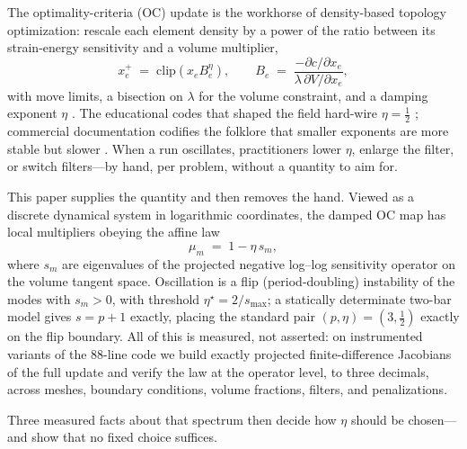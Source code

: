 \documentclass[11pt,a4paper]{article}
\newcommand{\smax}{s_{\max}}
\newcommand{\etastar}{\eta^{\star}}
\begin{document}
The optimality-criteria (OC) update is the workhorse of density-based
topology optimization: rescale each element density by a power of the
ratio between its strain-energy sensitivity and a volume multiplier,
\begin{equation}
  x_e^{+} \;=\; \mathrm{clip}\!\left( x_e B_e^{\eta} \right),
  \qquad
  B_e \;=\; \frac{-\partial c/\partial x_e}{\lambda\,\partial V/\partial x_e},
  \label{eq:oc}
\end{equation}
with move limits, a bisection on $\lambda$ for the volume constraint,
and a damping exponent $\eta$ \citep{bendsoe1989}. The educational codes
that shaped the field hard-wire $\eta=\tfrac12$
\citep{sigmund2001top99,andreassen2011top88}; commercial documentation
codifies the folklore that smaller exponents are more stable but slower
\citep{abaqus_stressratio}. When a run oscillates, practitioners lower
$\eta$, enlarge the filter, or switch filters---by hand, per problem,
without a quantity to aim for.

This paper supplies the quantity and then removes the hand. Viewed as a
discrete dynamical system in logarithmic coordinates, the damped OC map
has local multipliers obeying the affine law
\begin{equation}
  \mu_m \;=\; 1-\eta\, s_m ,
  \label{eq:law}
\end{equation}
where $s_m$ are eigenvalues of the projected negative log--log
sensitivity operator on the volume tangent space. Oscillation is a flip
(period-doubling) instability of the modes with $s_m>0$, with threshold
$\etastar = 2/\smax$; a statically determinate two-bar model gives
$s=p{+}1$ exactly, placing the standard pair $(p,\eta)=(3,\tfrac12)$
exactly on the flip boundary. All of this is measured, not asserted: on
instrumented variants of the 88-line code we build exactly projected
finite-difference Jacobians of the full update and verify the law at the
operator level, to three decimals, across meshes, boundary conditions,
volume fractions, filters, and penalizations.

Three measured facts about that spectrum then decide how $\eta$ should
be chosen---and show that no fixed choice suffices.
\end{document}

